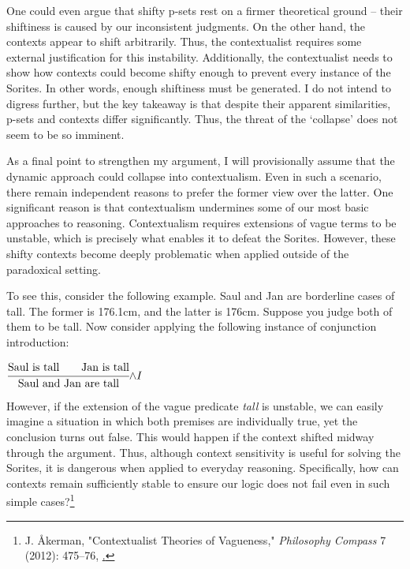One could even argue that shifty p-sets rest on a firmer theoretical
ground -- their shiftiness is caused by our inconsistent judgments. On
the other hand, the contexts appear to shift arbitrarily. Thus, the
contextualist requires some external justification for this instability.
Additionally, the contextualist needs to show how contexts could become
shifty enough to prevent every instance of the Sorites. In other words,
enough shiftiness must be generated. I do not intend to digress further,
but the key takeaway is that despite their apparent similarities, p-sets
and contexts differ significantly. Thus, the threat of the `collapse'
does not seem to be so imminent.

As a final point to strengthen my argument, I will provisionally assume
that the dynamic approach could collapse into contextualism. Even in
such a scenario, there remain independent reasons to prefer the former
view over the latter. One significant reason is that contextualism
undermines some of our most basic approaches to reasoning. Contextualism
requires extensions of vague terms to be unstable, which is precisely
what enables it to defeat the Sorites. However, these shifty contexts
become deeply problematic when applied outside of the paradoxical
setting.

To see this, consider the following example. Saul and Jan are borderline
cases of tall. The former is 176.1cm, and the latter is 176cm. Suppose
you judge both of them to be tall. Now consider applying the following
instance of conjunction introduction:

\begin{center}
  $\cfrac{\text{Saul is tall} \hspace{2em} \text{Jan is tall}}
  {\text{Saul and Jan are tall}} {\land I}$
\end{center}
However, if the extension of the vague predicate \emph{tall} is
unstable, we can easily imagine a situation in which both premises are
individually true, yet the conclusion turns out false. This would happen
if the context shifted midway through the argument. Thus, although
context sensitivity is useful for solving the Sorites, it is dangerous
when applied to everyday reasoning. Specifically, how can contexts
remain sufficiently stable to ensure our logic does not fail even in
such simple cases?\footnote{J. Åkerman, "Contextualist Theories of
  Vagueness," \emph{Philosophy Compass} 7 (2012): 475--76,
  \href{https://doi.org/10.1111/j.1747-9991.2012.00495.x}.}

